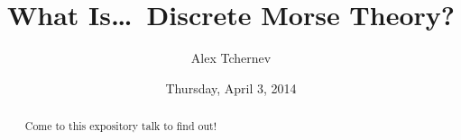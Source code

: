 \documentclass{UAmathtalk}
\author{Alex Tchernev}
\title{What Is\ldots\ Discrete Morse Theory?}
\date{Thursday, April 3, 2014}
\begin{document}
\maketitle

\begin{abstract}
Come to this expository talk to find out!
\end{abstract}
\end{document}
